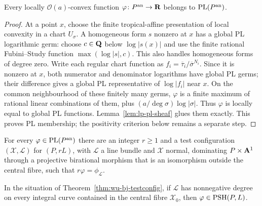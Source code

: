 \begin{lemma}\label{lem:wu-locally-convex-pl}
\leanok
{}
Every locally $\mathcal O(a)$-convex function $\varphi\colon P^{\mathrm{an}}\to\mathbf{R}$ belongs to $\operatorname{PL}(P^{\mathrm{an}})$.
\end{lemma}

\begin{proof}
At a point $x$, choose the finite tropical-affine presentation of local convexity in a chart
$U_\sigma$. A homogeneous form $s$ nonzero at $x$ has a global PL logarithmic germ: choose
$c\in\mathbf{Q}$ below $\log|s(x)|$ and use the finite rational Fubini--Study function
$\max(\log|s|,c)$. This also handles homogeneous forms of degree zero.
Write each regular chart function as $f_i=\overline\tau_i/\overline\sigma^{N_i}$.
Since it is nonzero at $x$, both numerator and denominator logarithms have global PL germs;
their difference gives a global PL representative of $\log|f_i|$ near $x$.
On the common neighbourhood of these finitely many germs, $\varphi$ is a finite maximum of
rational linear combinations of them, plus $(a/\deg\sigma)\log|\sigma|$.
Thus $\varphi$ is locally equal to global PL functions. Lemma~\ref{lem:lp-pl-sheaf} glues them
exactly. This proves PL membership; the positivity criterion below remains a separate step.
\end{proof}

\begin{theorem}\label{thm:wu-bj-testconfig}
\notready
{}
For every $\varphi\in\operatorname{PL}(P^{\mathrm{an}})$ there are an integer $r\ge1$ and a test configuration
$(\mathcal X,\mathcal L)$ for $(P,rL)$, with $\mathcal L$ a line bundle and $\mathcal X$ normal, dominating
$P\times\mathbf{A}^1$ through a projective birational morphism that is an isomorphism outside the central fibre, such that
$r\varphi=\phi_{\mathcal L}$.
\end{theorem}

\begin{theorem}\label{thm:wu-bj-nef-psh}
\notready
{}
In the situation of Theorem~\ref{thm:wu-bj-testconfig}, if $\mathcal L$ has nonnegative degree on every integral curve
contained in the central fibre $\mathcal X_0$, then $\varphi\in\operatorname{PSH}(P,L)$.
\end{theorem}


